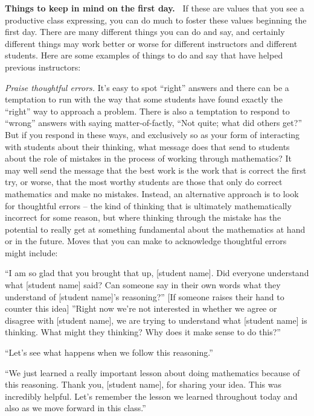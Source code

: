 \documentclass[11pt]{article}
\newenvironment{bignote}[1][Instructor note]%
	{\begin{mdframed}\raggedright{\bf #1.~}}
	{\end{mdframed}}
\theoremstyle{definition}
\begin{document}
\begin{bignote}[Things to keep in mind on the first day]
If these are values that you see a productive class expressing, you can do much to foster these values beginning the first day. There are many different things you can do and say, and certainly different things may work better or worse for different instructors and different students. Here are some examples of things to do and say that have helped previous \MODULES instructors:
	\begin{itemize*}
	\item {\it Praise thoughtful errors.} It's easy to spot ``right'' answers and there can be a temptation to run with the way that some students have found exactly the ``right'' way to approach a problem. There is also a temptation to respond to ``wrong'' answers with saying matter-of-factly, ``Not quite; what did others get?'' But if you respond in these ways, and exclusively so as your form of interacting with students about their thinking, what message does that send to students about the role of mistakes in the process of working through mathematics? It may well send the message that the best work is the work that is correct the first try, or worse, that the most worthy students are those that only do correct mathematics and make no mistakes. Instead, an alternative approach is to look for thoughtful errors -- the kind of thinking that is ultimately mathematically incorrect for some reason, but where thinking through the mistake has the potential to really get at something fundamental about the mathematics at hand or in the future. Moves that you can make to acknowledge thoughtful errors might include:
		\begin{itemize*}
		\item ``I am so glad that you brought that up, [student name]. Did everyone understand what [student name] said? Can someone say in their own words what they understand of [student name]'s reasoning?'' [If someone raises their hand to counter this idea] ''Right now we're not interested in whether we agree or disagree with [student name], we are trying to understand what [student name] is thinking. What might they thinking? Why does it make sense to do this?''
		\item ``Let's see what happens when we follow this reasoning.''
		\item ``We just learned a really important lesson about doing mathematics because of this reasoning. Thank you, [student name], for sharing your idea. This was incredibly helpful. Let's remember the lesson we learned throughout today and also as we move forward in this class.''  
		\end{itemize*}

\end{itemize*}
\end{bignote}
\end{document}
